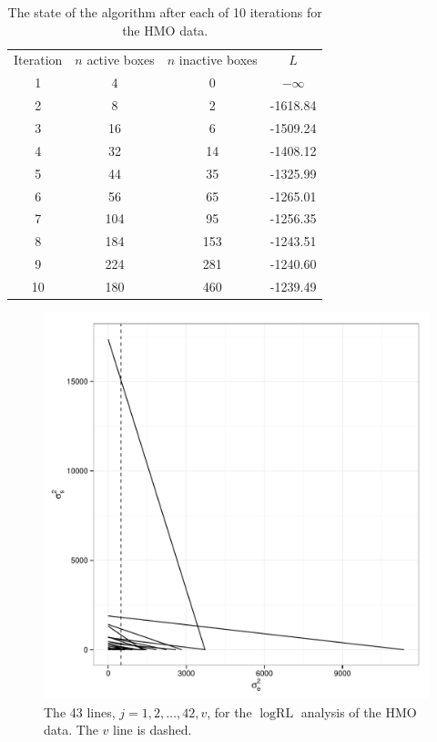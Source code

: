 \documentclass{report}
\newcommand{\RLorig}{\text{RL}}
\newcommand{\logRLorig}{\log\RLorig}
\begin{document}
\begin{table}[h]
\centering
\begin{tabular}{|c|c|c|c|}
\hline
Iteration & $n$ active boxes & $n$ inactive boxes & $L$\\
1 & 4 & 0 & $-\infty$\\
2 & 8 & 2 & -1618.84\\
3 & 16 & 6 & -1509.24\\
4 & 32 & 14 & -1408.12\\
5 & 44 & 35 & -1325.99\\
6 & 56 & 65 & -1265.01\\
7 & 104 & 95 & -1256.35\\
8 & 184 & 153 & -1243.51\\
9 & 224 & 281 & -1240.60\\
10 & 180 & 460 & -1239.49\\
\hline
\end{tabular}
\caption{The state of the algorithm after each of 10 iterations for the HMO data.}
\label{table:hmo_HH11_run}
\end{table}

\begin{figure}
	\centering
	\includegraphics[width=.45\linewidth]{figs/hmo_HH11_lines.pdf}
	\caption{The 43 lines, $j=1, 2, \dots, 42, v$, for the $\logRLorig$ analysis of the HMO data.
	              The $v$ line is dashed.}
	\label{fig:hmolines}
\end{figure}
\end{document}

